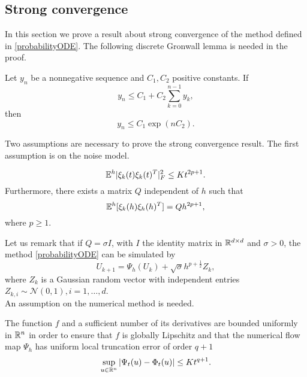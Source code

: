 \subsection{Strong convergence}

In this section we prove a result about strong convergence of the method defined in \eqref{probabilityODE}. The following discrete Gronwall lemma is needed in the proof. 
\begin{theorem}\label{thm:Gronwall} Let $y_n$ be a nonnegative sequence and $C_1, C_2$ positive constants. If
\begin{equation}
	y_n \leq C_1 + C_2 \sum_{k=0}^{n-1} y_k,
\end{equation}
then 
\begin{equation}
	y_n \leq C_1 \exp(nC_2).
\end{equation}
\end{theorem}
\noindent Two assumptions are necessary to prove the strong convergence result. The first assumption is on the noise model.
\begin{assumption}\label{assumption_1}
\begin{equation}
	\mathbb{E}^h|\xi_k(t)\xi_k(t)^T|^2_F \leq Kt^{2p+1}.
\end{equation}
Furthermore, there exists a matrix $Q$ independent of $h$ such that 
\begin{equation}
	\mathbb{E}^h[\xi_k(h)\xi_h(h)^T] = Qh^{2p+1},
\end{equation}
where $p\geq 1$.
\end{assumption}
\noindent Let us remark that if $Q = \sigma I$, with $I$ the identity matrix in $\mathbb{R}^{d\times d}$ and $\sigma > 0$, the method \eqref{probabilityODE} can be simulated by
\begin{equation}
	U_{k+1} = \Psi_h(U_k) + \sqrt{\sigma} h^{p + \frac{1}{2}} Z_k,
\end{equation}
where $Z_k$ is a Gaussian random vector with independent entries $Z_{k,i}  \sim\mathcal{N}(0,1), i = 1, \ldots, d$. \\
An assumption on the numerical method is needed.
\begin{assumption}\label{assumption_2}  The function $f$ and a sufficient number of its derivatives are bounded uniformly in $\mathbb{R}^n$ in order to ensure that $f$ is globally Lipschitz and that the numerical flow map $\Psi_h$ has uniform local truncation error of order $q + 1$
\begin{equation}
	\sup_{u\in\mathbb{R}^n} |\Psi_t(u) - \Phi_t(u)| \leq Kt^{q+1}.
\end{equation}
\end{assumption}
